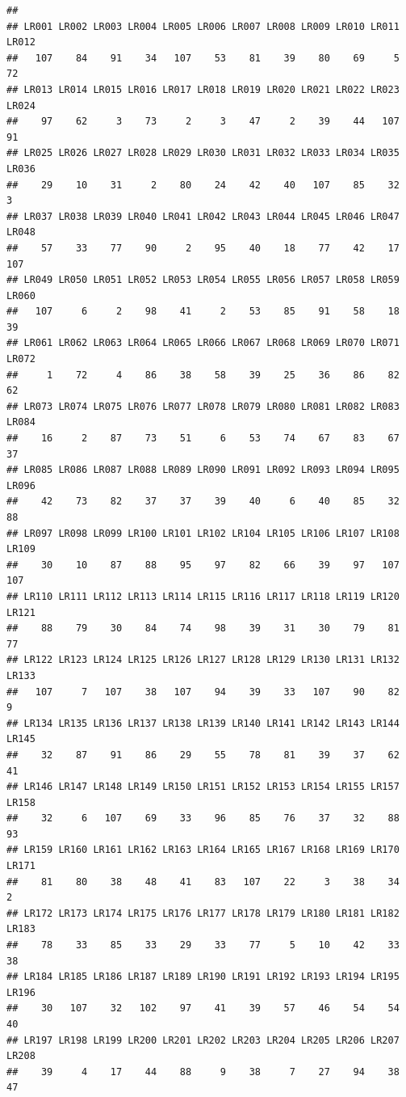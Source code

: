 \documentclass[]{book}
\begin{document}
\begin{verbatim}
## 
## LR001 LR002 LR003 LR004 LR005 LR006 LR007 LR008 LR009 LR010 LR011 LR012 
##   107    84    91    34   107    53    81    39    80    69     5    72 
## LR013 LR014 LR015 LR016 LR017 LR018 LR019 LR020 LR021 LR022 LR023 LR024 
##    97    62     3    73     2     3    47     2    39    44   107    91 
## LR025 LR026 LR027 LR028 LR029 LR030 LR031 LR032 LR033 LR034 LR035 LR036 
##    29    10    31     2    80    24    42    40   107    85    32     3 
## LR037 LR038 LR039 LR040 LR041 LR042 LR043 LR044 LR045 LR046 LR047 LR048 
##    57    33    77    90     2    95    40    18    77    42    17   107 
## LR049 LR050 LR051 LR052 LR053 LR054 LR055 LR056 LR057 LR058 LR059 LR060 
##   107     6     2    98    41     2    53    85    91    58    18    39 
## LR061 LR062 LR063 LR064 LR065 LR066 LR067 LR068 LR069 LR070 LR071 LR072 
##     1    72     4    86    38    58    39    25    36    86    82    62 
## LR073 LR074 LR075 LR076 LR077 LR078 LR079 LR080 LR081 LR082 LR083 LR084 
##    16     2    87    73    51     6    53    74    67    83    67    37 
## LR085 LR086 LR087 LR088 LR089 LR090 LR091 LR092 LR093 LR094 LR095 LR096 
##    42    73    82    37    37    39    40     6    40    85    32    88 
## LR097 LR098 LR099 LR100 LR101 LR102 LR104 LR105 LR106 LR107 LR108 LR109 
##    30    10    87    88    95    97    82    66    39    97   107   107 
## LR110 LR111 LR112 LR113 LR114 LR115 LR116 LR117 LR118 LR119 LR120 LR121 
##    88    79    30    84    74    98    39    31    30    79    81    77 
## LR122 LR123 LR124 LR125 LR126 LR127 LR128 LR129 LR130 LR131 LR132 LR133 
##   107     7   107    38   107    94    39    33   107    90    82     9 
## LR134 LR135 LR136 LR137 LR138 LR139 LR140 LR141 LR142 LR143 LR144 LR145 
##    32    87    91    86    29    55    78    81    39    37    62    41 
## LR146 LR147 LR148 LR149 LR150 LR151 LR152 LR153 LR154 LR155 LR157 LR158 
##    32     6   107    69    33    96    85    76    37    32    88    93 
## LR159 LR160 LR161 LR162 LR163 LR164 LR165 LR167 LR168 LR169 LR170 LR171 
##    81    80    38    48    41    83   107    22     3    38    34     2 
## LR172 LR173 LR174 LR175 LR176 LR177 LR178 LR179 LR180 LR181 LR182 LR183 
##    78    33    85    33    29    33    77     5    10    42    33    38 
## LR184 LR185 LR186 LR187 LR189 LR190 LR191 LR192 LR193 LR194 LR195 LR196 
##    30   107    32   102    97    41    39    57    46    54    54    40 
## LR197 LR198 LR199 LR200 LR201 LR202 LR203 LR204 LR205 LR206 LR207 LR208 
##    39     4    17    44    88     9    38     7    27    94    38    47 

\end{verbatim}
\end{document}
